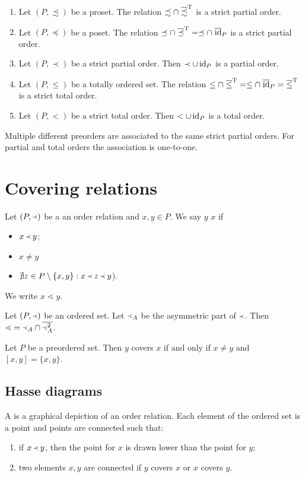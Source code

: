 \begin{proposition}
\mbox{}
\begin{enumerate}
\item Let $(P, \precsim)$ be a proset. The relation $\precsim \cap\; \overline{\precsim}^{\mathrm{T}}$
is a strict partial order.
\item Let $(P, \preceq)$ be a poset. The relation $\preceq \cap \;\overline{\preceq}^{\mathrm{T}} = \preceq \cap\; \overline{\operatorname{id}}_P$
is a strict partial order.
\item Let $(P, \prec)$ be a strict partial order. Then $\prec \cup \operatorname{id}_P$ is a partial order.
\item Let $(P, \leq)$ be a totally ordered set. The relation $\leq \cap\; \overline{\leq}^{\mathrm{T}} = \leq \cap\; \overline{\operatorname{id}}_P = \overline{\leq}^{\mathrm{T}}$
is a strict total order.
\item Let $(P, <)$ be a strict total order. Then $< \cup \operatorname{id}_P$ is a total order.
\end{enumerate}
Multiple different preorders are associated to the same strict partial orders. For partial and total orders the association is one-to-one.
\end{proposition}

\section{Covering relations}
\begin{definition}
Let $(P,\Yleft)$ be a an order relation and $x,y\in P$. We say $y$  $x$ if
\begin{itemize}
\item $x\Yleft y$;
\item $x\neq y$
\item $\nexists z\in P\setminus\{x,y\}: x\Yleft z \Yleft y$).
\end{itemize}
We write $x\lessdot y$.
\end{definition}

\begin{lemma}
Let $(P,\Yleft)$ be an ordered set. Let $\Yleft_A$ be the asymmetric part of $\Yleft$. Then $\lessdot = \Yleft_A \cap \overline{\Yleft_A^2}$.
\end{lemma}

\begin{lemma}
Let $P$ be a preordered set. Then $y$ covers $x$ \textup{if and only if} $x\neq y$ and $[x,y] = \{x,y\}$.
\end{lemma}

\subsection{Hasse diagrams}
A  is a graphical depiction of an order relation. Each element of the ordered set is a point and points are connected such that:
\begin{enumerate}
\item if $x \Yleft y$, then the point for $x$ is drawn lower than the point for $y$;
\item two elements $x,y$ are connected if $y$ covers $x$ or $x$ covers $y$.
\end{enumerate}

